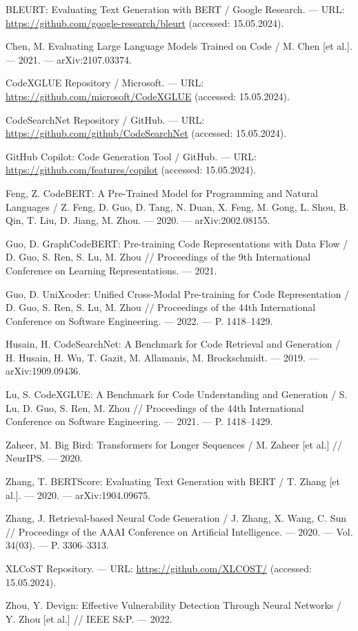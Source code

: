 \documentclass[14pt]{article}
\theoremstyle{definition}
\begin{document}
\begin{thebibliography}{99}
BLEURT: Evaluating Text Generation with BERT / Google Research. — URL: \url{https://github.com/google-research/bleurt} (accessed: 15.05.2024).

Chen, M. Evaluating Large Language Models Trained on Code / M. Chen [et al.]. — 2021. — arXiv:2107.03374.

CodeXGLUE Repository / Microsoft. — URL: \url{https://github.com/microsoft/CodeXGLUE} (accessed: 15.05.2024).

CodeSearchNet Repository / GitHub. — URL: \url{https://github.com/github/CodeSearchNet} (accessed: 15.05.2024).

GitHub Copilot: Code Generation Tool / GitHub. — URL: \url{https://github.com/features/copilot} (accessed: 15.05.2024).

Feng, Z. CodeBERT: A Pre-Trained Model for Programming and Natural Languages / Z. Feng, D. Guo, D. Tang, N. Duan, X. Feng, M. Gong, L. Shou, B. Qin, T. Liu, D. Jiang, M. Zhou. — 2020. — arXiv:2002.08155.

Guo, D. GraphCodeBERT: Pre-training Code Representations with Data Flow / D. Guo, S. Ren, S. Lu, M. Zhou // Proceedings of the 9th International Conference on Learning Representations. — 2021.

Guo, D. UniXcoder: Unified Cross-Modal Pre-training for Code Representation / D. Guo, S. Ren, S. Lu, M. Zhou // Proceedings of the 44th International Conference on Software Engineering. — 2022. — P. 1418–1429.

Husain, H. CodeSearchNet: A Benchmark for Code Retrieval and Generation / H. Husain, H. Wu, T. Gazit, M. Allamanis, M. Brockschmidt. — 2019. — arXiv:1909.09436.

Lu, S. CodeXGLUE: A Benchmark for Code Understanding and Generation / S. Lu, D. Guo, S. Ren, M. Zhou // Proceedings of the 44th International Conference on Software Engineering. — 2021. — P. 1418–1429.

Zaheer, M. Big Bird: Transformers for Longer Sequences / M. Zaheer [et al.] // NeurIPS. — 2020.

Zhang, T. BERTScore: Evaluating Text Generation with BERT / T. Zhang [et al.]. — 2020. — arXiv:1904.09675.

Zhang, J. Retrieval-based Neural Code Generation / J. Zhang, X. Wang, C. Sun // Proceedings of the AAAI Conference on Artificial Intelligence. — 2020. — Vol. 34(03). — P. 3306–3313.

XLCoST Repository. — URL: \url{https://github.com/XLCOST/} (accessed: 15.05.2024).

Zhou, Y. Devign: Effective Vulnerability Detection Through Neural Networks / Y. Zhou [et al.] // IEEE S\&P. — 2022.

\end{thebibliography}
\end{document}
